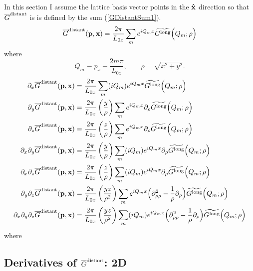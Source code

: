 \documentclass[letterpaper]{article}
\newcommand{\GB}{\overline{G}}
\newcommand{\wt}{\widetilde}
\begin{document}
In this section I assume the lattice basis vector points
in the $\mathbf{\hat x}$ direction so that $\GB\sups{distant}$ is 
is defined by the sum (\ref{GDistantSum1}).
\begin{align*}
  \overline{G}\sups{distant}(\vb p, \vb x) 
  =\frac{2\pi}{L_{0x}} \sum_{m} e^{i Q_m x}
   \wt{G\sups{long}}\Big( Q_m; \rho\Big)
\end{align*}
where 
$$Q_m \equiv p_x - \frac{2m\pi}{L_{0x}}, \qquad \rho=\sqrt{x^2 + y^2}.$$
\begin{align*}
 \partial_x 
  \overline{G}\sups{distant}(\vb p, \vb x) 
 &=\frac{2\pi}{L_{0x}} \sum_{m} (iQ_m) e^{i Q_m x}
   \wt{G\sups{long}}\Big( Q_m; \rho\Big)
\\
 \partial_y 
  \overline{G}\sups{distant}(\vb p, \vb x) 
 &=\frac{2\pi}{L_{0x}} \pf{y}{\rho} \sum_{m} e^{i Q_m x}
   \partial_\rho \wt{G\sups{long}}\Big( Q_m; \rho\Big)
\\
 \partial_z 
  \overline{G}\sups{distant}(\vb p, \vb x) 
 &=\frac{2\pi}{L_{0x}} \pf{z}{\rho} \sum_{m} e^{i Q_m x}
   \partial_\rho \wt{G\sups{long}}\Big( Q_m; \rho\Big)
\\
 \partial_x \partial_y
  \overline{G}\sups{distant}(\vb p, \vb x) 
 &=\frac{2\pi}{L_{0x}} \pf{y}{\rho} \sum_{m} (iQ_m) e^{i Q_m x}
   \partial_\rho \wt{G\sups{long}}\Big( Q_m; \rho\Big)
\\
 \partial_x \partial_z
  \overline{G}\sups{distant}(\vb p, \vb x) 
 &=\frac{2\pi}{L_{0x}} \pf{z}{\rho} \sum_{m} (iQ_m) e^{i Q_m x}
   \partial_\rho \wt{G\sups{long}}\Big( Q_m; \rho\Big)
\\
 \partial_y \partial_z
  \overline{G}\sups{distant}(\vb p, \vb x) 
 &=\frac{2\pi}{L_{0x}} \pf{yz}{\rho^2} \sum_{m} e^{i Q_m x}
   \Big( \partial^2_{\rho\rho} -\frac{1}{\rho}\partial_\rho\Big)
   \wt{G\sups{long}}\Big( Q_m; \rho\Big)
\\
 \partial_x \partial_y \partial_z
  \overline{G}\sups{distant}(\vb p, \vb x) 
 &=\frac{2\pi}{L_{0x}} \pf{yz}{\rho^2} \sum_{m} (iQ_m) e^{i Q_m x}
   \Big( \partial^2_{\rho\rho} -\frac{1}{\rho}\partial_\rho\Big)
   \wt{G\sups{long}}\Big( Q_m; \rho\Big)
\end{align*}
where 

\subsection{Derivatives of $\GB\sups{distant}$: 2D}
\end{document}

